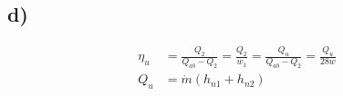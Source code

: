 

\subsection*{d)}

\begin{align*}
\eta_u &= \frac{Q_2}{Q_{ab} - Q_2} = \frac{Q_2}{w_1} = \frac{Q_u}{Q_{ab} - Q_2} = \frac{Q_u}{28w} \\
Q_u &= \dot{m} (h_{n1} + h_{n2})
\end{align*}
